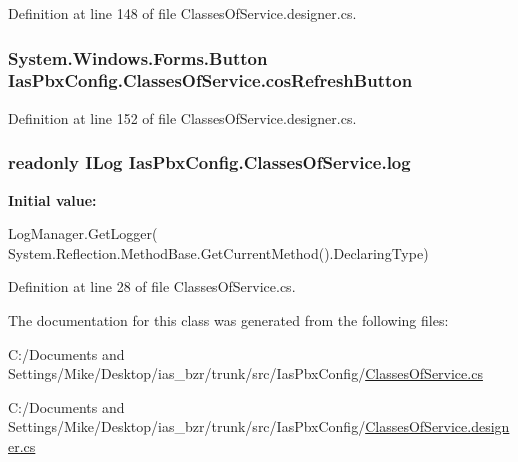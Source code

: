 Definition at line 148 of file ClassesOfService.designer.cs.\hypertarget{class_ias_pbx_config_1_1_classes_of_service_a55630abdbdee23747de3d654e8beecaf}{
\subsubsection[{cosRefreshButton}]{\setlength{\rightskip}{0pt plus 5cm}System.Windows.Forms.Button {\bf IasPbxConfig.ClassesOfService.cosRefreshButton}}}
\label{class_ias_pbx_config_1_1_classes_of_service_a55630abdbdee23747de3d654e8beecaf}


Definition at line 152 of file ClassesOfService.designer.cs.\hypertarget{class_ias_pbx_config_1_1_classes_of_service_a0e880fa24b3e6353d0f88de7f293612e}{
\subsubsection[{log}]{\setlength{\rightskip}{0pt plus 5cm}readonly ILog {\bf IasPbxConfig.ClassesOfService.log}}}
\label{class_ias_pbx_config_1_1_classes_of_service_a0e880fa24b3e6353d0f88de7f293612e}
{\bfseries Initial value:}
\begin{DoxyCode}
 LogManager.GetLogger(
            System.Reflection.MethodBase.GetCurrentMethod().DeclaringType)
\end{DoxyCode}


Definition at line 28 of file ClassesOfService.cs.

The documentation for this class was generated from the following files:\begin{DoxyCompactItemize}
\item 
C:/Documents and Settings/Mike/Desktop/ias\_\-bzr/trunk/src/IasPbxConfig/\hyperlink{_classes_of_service_8cs}{ClassesOfService.cs}\item 
C:/Documents and Settings/Mike/Desktop/ias\_\-bzr/trunk/src/IasPbxConfig/\hyperlink{_classes_of_service_8designer_8cs}{ClassesOfService.designer.cs}\end{DoxyCompactItemize}
